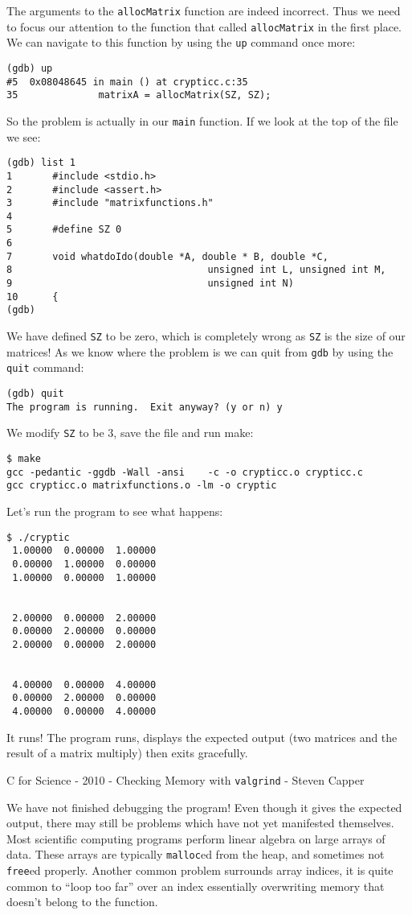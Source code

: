 \documentclass[a4paper,12pt]{article}
\begin{document}
The arguments to the \verb|allocMatrix| function are indeed incorrect. Thus we need to focus our attention to the function that called \verb|allocMatrix| in the first place. We can navigate to this function by using the {\tt up} command once more:
\begin{verbatim}
(gdb) up
#5  0x08048645 in main () at crypticc.c:35
35              matrixA = allocMatrix(SZ, SZ);
\end{verbatim}
So the problem is actually in our {\tt main} function. If we look at the top of the file we see:
\begin{verbatim}
(gdb) list 1
1       #include <stdio.h>
2       #include <assert.h>
3       #include "matrixfunctions.h"
4
5       #define SZ 0
6
7       void whatdoIdo(double *A, double * B, double *C,
8                                  unsigned int L, unsigned int M,
9                                  unsigned int N)
10      {
(gdb) 
\end{verbatim}
We have defined {\tt SZ} to be zero, which is completely wrong as {\tt SZ} is the size of our matrices! As we know where the problem is we can quit from {\tt gdb} by using the {\tt quit} command:
\begin{verbatim}
(gdb) quit
The program is running.  Exit anyway? (y or n) y
\end{verbatim}
We modify {\tt SZ} to be 3, save the file and run make:
\begin{verbatim}
$ make
gcc -pedantic -ggdb -Wall -ansi    -c -o crypticc.o crypticc.c
gcc crypticc.o matrixfunctions.o -lm -o cryptic
\end{verbatim}
Let's run the program to see what happens:
\begin{verbatim}
$ ./cryptic 
 1.00000  0.00000  1.00000 
 0.00000  1.00000  0.00000 
 1.00000  0.00000  1.00000 


 2.00000  0.00000  2.00000 
 0.00000  2.00000  0.00000 
 2.00000  0.00000  2.00000 


 4.00000  0.00000  4.00000 
 0.00000  2.00000  0.00000 
 4.00000  0.00000  4.00000
\end{verbatim}
It runs! The program runs, displays the expected output (two matrices and the result of a matrix multiply) then exits gracefully.\newpage
\begin{center}
\large C for Science - 2010 - Checking Memory with {\tt valgrind} - Steven Capper
\end{center}
We have not finished debugging the program! Even though it gives the expected output, there may still be problems which have not yet manifested themselves. Most scientific computing programs perform linear algebra on large arrays of data. These arrays are typically {\tt malloc}ed from the heap, and sometimes not {\tt free}ed properly. Another common problem surrounds array indices, it is quite common to ``loop too far'' over an index essentially overwriting memory that doesn't belong to the function.
\end{document}
